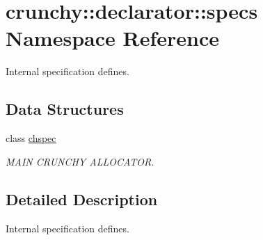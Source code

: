 \hypertarget{namespacecrunchy_1_1declarator_1_1specs}{}\section{crunchy\+:\+:declarator\+:\+:specs Namespace Reference}
\label{namespacecrunchy_1_1declarator_1_1specs}


Internal specification defines.  


\subsection*{Data Structures}
\begin{DoxyCompactItemize}
\item 
class \hyperlink{classcrunchy_1_1declarator_1_1specs_1_1chspec}{chspec}
\begin{DoxyCompactList}\small\item\em M\+A\+IN C\+R\+U\+N\+C\+HY A\+L\+L\+O\+C\+A\+T\+OR. \end{DoxyCompactList}\end{DoxyCompactItemize}


\subsection{Detailed Description}
Internal specification defines. 